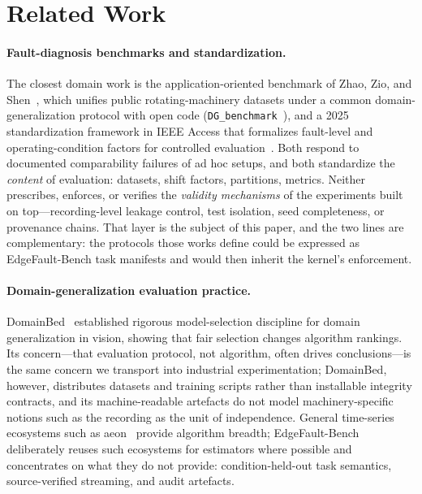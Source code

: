 \section{Related Work}
\label{sec:related}

\paragraph{Fault-diagnosis benchmarks and standardization.}
The closest domain work is the application-oriented benchmark of Zhao, Zio,
and Shen~\cite{zhao2024dgbenchmark}, which unifies public rotating-machinery
datasets under a common domain-generalization protocol with open code
(\texttt{DG\_benchmark}~\cite{dgbenchmarkrepo}), and a 2025 standardization
framework in IEEE Access that formalizes fault-level and operating-condition
factors for controlled evaluation~\cite{ieeeaccess2025standard}. Both respond
to documented comparability failures of ad hoc setups, and both standardize
the \emph{content} of evaluation: datasets, shift factors, partitions,
metrics. Neither prescribes, enforces, or verifies the \emph{validity
mechanisms} of the experiments built on top---recording-level leakage
control, test isolation, seed completeness, or provenance chains. That layer
is the subject of this paper, and the two lines are complementary: the
protocols those works define could be expressed as EdgeFault-Bench task
manifests and would then inherit the kernel's enforcement.

\paragraph{Domain-generalization evaluation practice.}
DomainBed~\cite{gulrajani2021domainbed} established rigorous
model-selection discipline for domain generalization in vision, showing that
fair selection changes algorithm rankings. Its concern---that evaluation
protocol, not algorithm, often drives conclusions---is the same concern we
transport into industrial experimentation; DomainBed, however, distributes
datasets and training scripts rather than installable integrity contracts,
and its machine-readable artefacts do not model machinery-specific notions
such as the recording as the unit of independence. General time-series
ecosystems such as aeon~\cite{middlehurst2025aeon} provide algorithm
breadth; EdgeFault-Bench deliberately reuses such ecosystems for estimators
where possible and concentrates on what they do not provide:
condition-held-out task semantics, source-verified streaming, and audit
artefacts.

